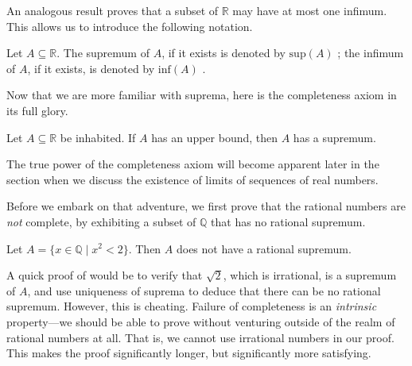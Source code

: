 An analogous result proves that a subset of $\mathbb{R}$ may have at most one infimum. This allows us to introduce the following notation.

\begin{definition}
Let $A \subseteq \mathbb{R}$. The supremum of $A$, if it exists is denoted by $\mathrm{sup}(A)$ ; the infimum of $A$, if it exists, is denoted by $\mathrm{inf}(A)$ .
\end{definition}

Now that we are more familiar with suprema, here is the completeness axiom in its full glory.

\begin{axiom}
\label{axCompletenessOfR}
Let $A \subseteq \mathbb{R}$ be inhabited. If $A$ has an upper bound, then $A$ has a supremum.
\end{axiom}

The true power of the completeness axiom will become apparent later in the section when we discuss the existence of limits of sequences of real numbers.

Before we embark on that adventure, we first prove that the rational numbers are \textit{not} complete, by exhibiting a subset of $\mathbb{Q}$ that has no rational supremum.

\begin{proposition}
\label{propIrrationalsNotComplete}
Let $A = \{ x \in \mathbb{Q} \mid x^2 < 2 \}$. Then $A$ does not have a rational supremum.
\end{proposition}

A quick proof of  would be to verify that $\sqrt{2}$, which is irrational, is a supremum of $A$, and use uniqueness of suprema to deduce that there can be no rational supremum. However, this is cheating. Failure of completeness is an \textit{intrinsic} property---we should be able to prove  without venturing outside of the realm of rational numbers at all. That is, we cannot use irrational numbers in our proof. This makes the proof significantly longer, but significantly more satisfying.

